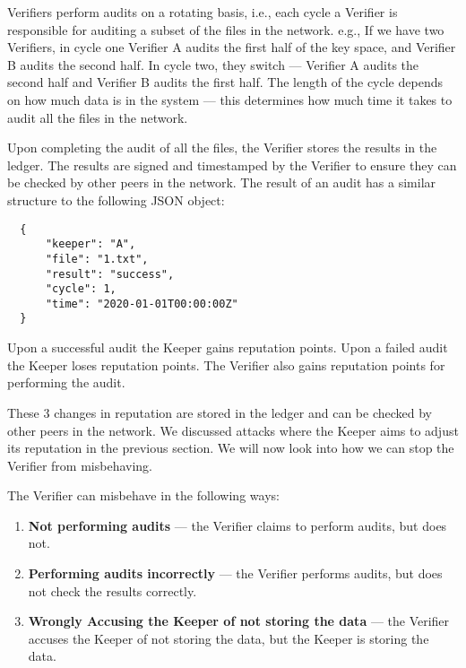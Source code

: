 Verifiers perform audits on a rotating basis, i.e., each cycle a Verifier is responsible for auditing
a subset of the files in the network.
e.g., If we have two Verifiers, in cycle one Verifier A audits the first half of the key space,
and Verifier B audits the second half.
In cycle two, they switch --- Verifier A audits the second half and Verifier B audits the first half.
The length of the cycle depends on how much data is in the system --- this determines
how much time it takes to audit all the files in the network.

Upon completing the audit of all the files, the Verifier stores the results in the ledger.
The results are signed and timestamped by the Verifier to
ensure they can be checked by other peers in the network.
The result of an audit has a similar structure to the following JSON object:
\begin{verbatim}
  {
      "keeper": "A",
      "file": "1.txt",
      "result": "success",
      "cycle": 1,
      "time": "2020-01-01T00:00:00Z"
  }
\end{verbatim}

Upon a successful audit the Keeper gains reputation points.
Upon a failed audit the Keeper loses reputation points.
The Verifier also gains reputation points for performing the audit.

These 3 changes in reputation are stored in the ledger and can be checked by other peers in the network.
We discussed attacks where the Keeper aims to adjust its reputation in the previous section.
We will now look into how we can stop the Verifier from misbehaving.

The Verifier can misbehave in the following ways:
\begin{enumerate}
    \item \textbf{Not performing audits} --- the Verifier claims to perform audits, but does not.
    \item \textbf{Performing audits incorrectly} --- the Verifier performs audits, but does not check the results correctly.
    \item \textbf{Wrongly Accusing the Keeper of not storing the data} --- the Verifier accuses the Keeper of not storing the data, but the Keeper is storing the data.
\end{enumerate}

